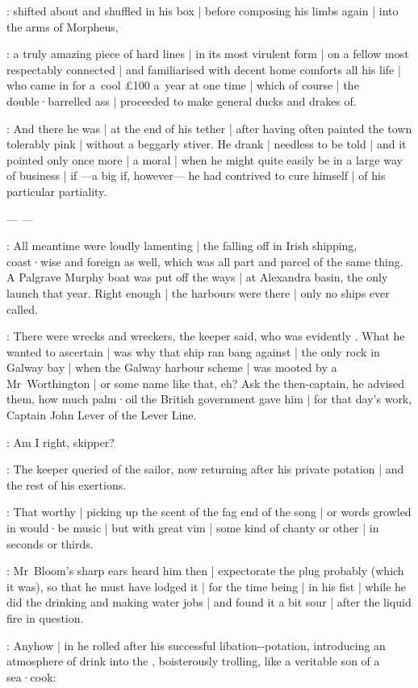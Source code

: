 :
shifted about and shuffled in his box |
before composing his limbs again |
into the arms of Morpheus,

:
a truly amazing piece of hard lines |
in its most virulent form |
on a fellow most respectably connected |
and familiarised with decent home comforts all his life |
who came in for a~cool £100 a~year at one time |
which of course |
the double·barrelled ass |
proceeded to make general ducks and drakes of.

:
And there he was |
at the end of his tether |
after having often painted the town tolerably pink |
without a beggarly stiver.
He drank |
needless to be told |
and it pointed only once more |
a moral |
when he might quite easily be in a large way of business |
if%
---a big if, however---%
he had contrived to cure himself |
of his particular partiality.

---  ---

:
All meantime were loudly lamenting |
the falling off in Irish shipping,
coast·wise and foreign as well,
which was all part and parcel of the same thing.
A Palgrave Murphy boat was put off the ways |
at Alexandra basin,
the only launch that year.
Right enough |
the harbours were there |
only no ships ever called.

:
There were wrecks and wreckers,
the keeper said,
who was evidently .
What he wanted to ascertain |
was why that ship ran bang against |
the only rock in Galway bay |
when the Galway harbour scheme |
was mooted by a Mr~Worthington |
or some name like that,
eh?
Ask the then-captain,
he advised them,
how much palm·oil the British government gave him |
for that day's work,
Captain John Lever of the Lever Line.

\SkinTheGoat:
Am I right,
skipper?

:
The keeper queried of the sailor,
now returning after his private potation |
and the rest of his exertions.%

:
That worthy |
picking up the scent of the fag end of the song |
or words growled in would·be music |
but with great vim |
some kind of chanty or other |
in seconds or thirds.

:
Mr~Bloom's sharp ears heard him then |
expectorate the plug probably
(which it was),
so that he must have lodged it |
for the time being |
in his fist |
while he did the drinking and making water jobs |
and found it a bit sour |
after the liquid fire in question.

:
Anyhow |
in he rolled after his successful libation--potation,
introducing an atmosphere of drink into the ,
boisterously trolling,
like a veritable son of a sea·cook:

